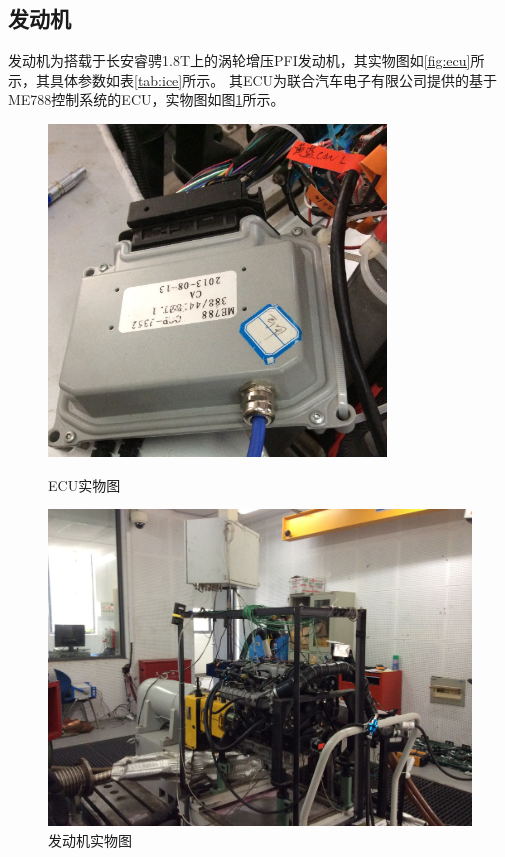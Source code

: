 \subsection{发动机}
发动机为搭载于长安睿骋1.8T上的涡轮增压PFI发动机，其实物图如\ref{fig:ecu}所示，其具体参数如表\ref{tab:ice}所示。
其ECU为联合汽车电子有限公司提供的基于ME788控制系统的ECU，实物图如图\ref{fig:ice}所示。
\begin{figure}[!ht]
	\begin{minipage}[h]{0.5\linewidth}
		\centering
		\includegraphics[width=0.8\textwidth]{thesis_figure/platformer_chapter/ecu}
		\caption{ECU实物图}
		\label{fig:ecu}
	\end{minipage}
	\begin{minipage}[h]{0.5\linewidth}
		\centering
		\includegraphics[width=\textwidth]{thesis_figure/platformer_chapter/ice}
		\caption{发动机实物图}
		\label{fig:ice}
	\end{minipage}
\end{figure}
